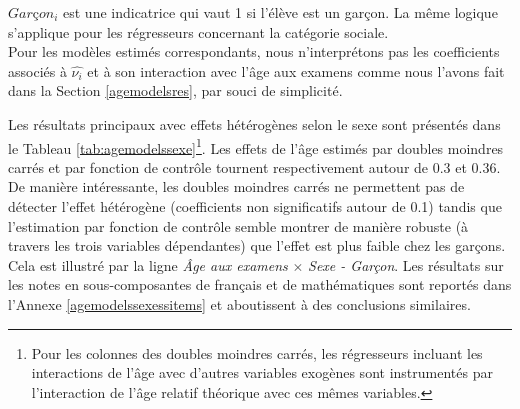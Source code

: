 \documentclass[
]{book}
\begin{document}
\(Garçon_i\) est une indicatrice qui vaut 1 si l'élève est un garçon. La même logique s'applique pour les régresseurs concernant la catégorie sociale.\\
Pour les modèles estimés correspondants, nous n'interprétons pas les coefficients associés à \(\hat{\nu_i}\) et à son interaction avec l'âge aux examens comme nous l'avons fait dans la Section \ref{agemodelsres}, par souci de simplicité.

\quad Les résultats principaux avec effets hétérogènes selon le sexe sont présentés dans le Tableau \ref{tab:agemodelssexe}\footnote{Pour les colonnes des doubles moindres carrés, les régresseurs incluant les interactions de l'âge avec d'autres variables exogènes sont instrumentés par l'interaction de l'âge relatif théorique avec ces mêmes variables.}. Les effets de l'âge estimés par doubles moindres carrés et par fonction de contrôle tournent respectivement autour de 0.3 et 0.36. De manière intéressante, les doubles moindres carrés ne permettent pas de détecter l'effet hétérogène (coefficients non significatifs autour de 0.1) tandis que l'estimation par fonction de contrôle semble montrer de manière robuste (à travers les trois variables dépendantes) que l'effet est plus faible chez les garçons. Cela est illustré par la ligne \emph{Âge aux examens} \(\times\) \emph{Sexe - Garçon}.
Les résultats sur les notes en sous-composantes de français et de mathématiques sont reportés dans l'Annexe \ref{agemodelssexessitems} et aboutissent à des conclusions similaires.

\begingroup\fontsize{8}{10}\selectfont
\end{document}
